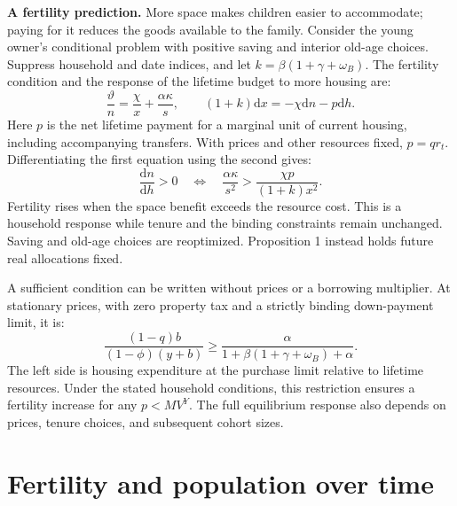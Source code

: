 \documentclass[11pt]{article}
\newcommand{\dd}{\mathrm d}
\begin{document}
\textbf{A fertility prediction.} More space makes children easier to
accommodate; paying for it reduces the goods available to the family.
Consider the young owner's conditional problem with positive saving and
interior old-age choices. Suppress household and date indices, and let
$k=\beta(1+\gamma+\omega_B)$. The fertility condition and the response of
the lifetime budget to more housing are:
\begin{equation}
 \frac{\vartheta}{n}=\frac{\chi}{x}+\frac{\alpha\kappa}{s},
 \qquad (1+k)\dd x=-\chi\dd n-p\dd h.
 \label{eq:core_fertility_system}
\end{equation}
Here $p$ is the net lifetime payment for a marginal unit of current housing,
including accompanying transfers. With prices and other resources fixed,
$p=q r_t$. Differentiating the first equation using the second gives:
\begin{equation}
 \frac{\dd n}{\dd h}>0
 \quad\Longleftrightarrow\quad
 \frac{\alpha\kappa}{s^2}>
 \frac{\chi p}{(1+k)x^2}.
 \label{eq:core_fertility_sign}
\end{equation}
Fertility rises when the space benefit exceeds the resource cost. This is a
household response while tenure and the binding constraints remain unchanged.
Saving and old-age choices are reoptimized. Proposition 1 instead holds
future real allocations fixed.

A sufficient condition can be written without prices or a borrowing
multiplier. At stationary prices, with zero property tax and a strictly
binding down-payment limit, it is:
\begin{equation}
 \frac{(1-q)b}{(1-\phi)(y+b)}
 \geq\frac{\alpha}{1+\beta(1+\gamma+\omega_B)+\alpha}.
 \label{eq:core_primitive}
\end{equation}
The left side is housing expenditure at the purchase limit relative to
lifetime resources. Under the stated household conditions, this restriction
ensures a fertility increase for any $p<MV^Y$. The full equilibrium response
also depends on prices, tenure choices, and subsequent cohort sizes.

\newpage
\section*{Fertility and population over time}
\end{document}
